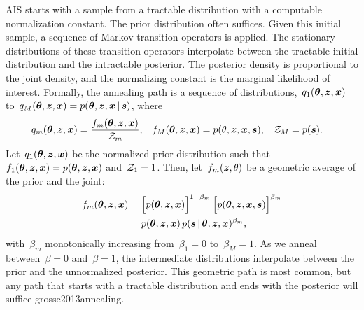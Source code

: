 \sloppy
AIS starts with a sample from a tractable distribution with a computable
normalization constant. The prior distribution often suffices.  Given this 
initial sample, a sequence of Markov transition operators is applied.
The stationary distributions of these transition operators interpolate
between the tractable initial distribution and the intractable posterior.
The posterior density is proportional to the joint density, and the normalizing 
constant is the marginal likelihood of interest.
Formally,  the annealing path is a sequence of
distributions,~${q_1(\boldsymbol{\theta}, \boldsymbol{z}, \boldsymbol{x})}$ 
to~${q_M(\boldsymbol{\theta}, \boldsymbol{z}, \boldsymbol{x}) = p(\boldsymbol{\theta}, \boldsymbol{z}, \boldsymbol{x} \,|\, \boldsymbol{s})}$,
where
\begin{align*}
q_m(\boldsymbol{\theta}, \boldsymbol{z}, \boldsymbol{x}) &= \frac{f_m(\boldsymbol{\theta}, \boldsymbol{z}, \boldsymbol{x})}{\mathcal{Z}_m}, & 
f_M(\boldsymbol{\theta}, \boldsymbol{z}, \boldsymbol{x}) &= p(\theta, \boldsymbol{z}, \boldsymbol{x}, \boldsymbol{s}), & 
\mathcal{Z}_M &= p(\boldsymbol{s}).
\end{align*}
Let~$q_1(\boldsymbol{\theta}, \boldsymbol{z}, \boldsymbol{x})$ be the normalized prior
distribution such
that~${f_1(\boldsymbol{\theta}, \boldsymbol{z}, \boldsymbol{x}) = p(\boldsymbol{\theta}, \boldsymbol{z}, \boldsymbol{x})}$
and~${\mathcal{Z}_1=1}$. Then, let~$f_m(\boldsymbol{z}, \theta)$ be a geometric
average of the prior and the joint:
\begin{align*}
  f_m(\boldsymbol{\theta}, \boldsymbol{z}, \boldsymbol{x}) 
  &=
  \Big[ p(\boldsymbol{\theta}, \boldsymbol{z}, \boldsymbol{x}) \Big]^{1-\beta_m} \,
  \Big[ p(\boldsymbol{\theta}, \boldsymbol{z}, \boldsymbol{x}, \boldsymbol{s}) \Big]^{\beta_m} \\
  &= p(\boldsymbol{\theta}, \boldsymbol{z}, \boldsymbol{x}) \, p(\boldsymbol{s} \,|\, \boldsymbol{\theta}, \boldsymbol{z}, \boldsymbol{x})^{\beta_m},
\end{align*}
with~$\beta_m$ monotonically increasing from~${\beta_1=0}$ to~${\beta_M=1}$.
As we anneal between~${\beta=0}$ and~${\beta=1}$, the intermediate distributions 
interpolate between the prior and the unnormalized posterior.
This geometric path is most common, but any path that starts with a tractable
distribution and ends with the posterior will suffice \citep{e.g.}{}{grosse2013annealing}.



